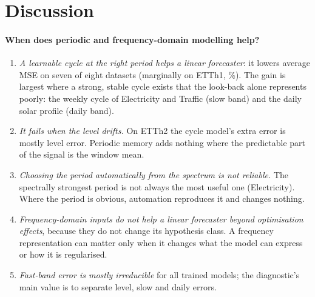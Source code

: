 \documentclass[11pt,a4paper]{article}
\begin{document}
\begin{table}[t]
\centering
\scriptsize
\setlength{\tabcolsep}{3.5pt}
\resizebox{\textwidth}{!}{}
\caption{\textbf{DSOF-SD distillation} (test MSE, mean over 3 seeds, full stride-1 test set). ``ctrl'': identical training with distillation weight 0. Bold: better than the control of the same student. Right: TimesFM teacher on the same test set, and CycleNet$_{\text{fix}}$ and Pro-SOR trained with the main recipe (Table~\ref{tab:main_mse}).}
\label{tab:dsof}
\end{table}

\section{Discussion}
\label{sec:discussion}

\paragraph{When does periodic and frequency-domain modelling help?}
\begin{enumerate}
    \item \emph{A learnable cycle at the right period helps a linear forecaster}: it lowers average MSE on seven of eight datasets (marginally on ETTh1, \vCycleETThOne\%). The gain is largest where a strong, stable cycle exists that the look-back alone represents poorly: the weekly cycle of Electricity and Traffic (slow band) and the daily solar profile (daily band).
    \item \emph{It fails when the level drifts.} On ETTh2 the cycle model's extra error is mostly level error. Periodic memory adds nothing where the predictable part of the signal is the window mean.
    \item \emph{Choosing the period automatically from the spectrum is not reliable.} The spectrally strongest period is not always the most useful one (Electricity). Where the period is obvious, automation reproduces it and changes nothing.
    \item \emph{Frequency-domain inputs do not help a linear forecaster beyond optimisation effects}, because they do not change its hypothesis class. A frequency representation can matter only when it changes what the model can express or how it is regularised.
    \item \emph{Fast-band error is mostly irreducible} for all trained models; the diagnostic's main value is to separate level, slow and daily errors.
\end{enumerate}
\end{document}
